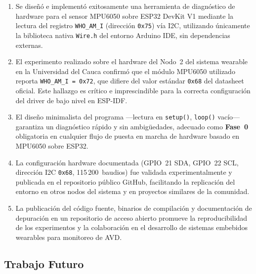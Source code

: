 \documentclass[10pt,twocolumn,a4paper]{article}
\begin{document}
\begin{enumerate}
  \item Se diseñó e implementó exitosamente una herramienta de
        diagnóstico de hardware para el sensor MPU6050 sobre ESP32
        DevKit V1 mediante la lectura del registro \texttt{WHO\_AM\_I}
        (dirección \texttt{0x75}) vía I2C, utilizando únicamente la
        biblioteca nativa \texttt{Wire.h} del entorno Arduino IDE, sin
        dependencias externas.

  \item El experimento realizado sobre el hardware del Nodo~2 del
        sistema wearable en la Universidad del Cauca confirmó que el
        módulo MPU6050 utilizado reporta \texttt{WHO\_AM\_I = 0x72},
        que difiere del valor estándar \texttt{0x68} del datasheet
        oficial. Este hallazgo es crítico e imprescindible para la
        correcta configuración del driver de bajo nivel en ESP-IDF.

  \item El diseño minimalista del programa —lectura en \texttt{setup()},
        \texttt{loop()} vacío— garantiza un diagnóstico rápido y sin
        ambigüedades, adecuado como \textbf{Fase~0} obligatoria en
        cualquier flujo de puesta en marcha de hardware basado en
        MPU6050 sobre ESP32.

  \item La configuración hardware documentada (GPIO~21 SDA, GPIO~22 SCL,
        dirección I2C \texttt{0x68}, 115\,200~baudios) fue validada
        experimentalmente y publicada en el repositorio público GitHub,
        facilitando la replicación del entorno en otros nodos del
        sistema y en proyectos similares de la comunidad.

  \item La publicación del código fuente, binarios de compilación
        y documentación de depuración en un repositorio de acceso abierto
        promueve la reproducibilidad de los experimentos y la
        colaboración en el desarrollo de sistemas embebidos wearables
        para monitoreo de AVD.
\end{enumerate}

\subsection{Trabajo Futuro}
\end{document}
